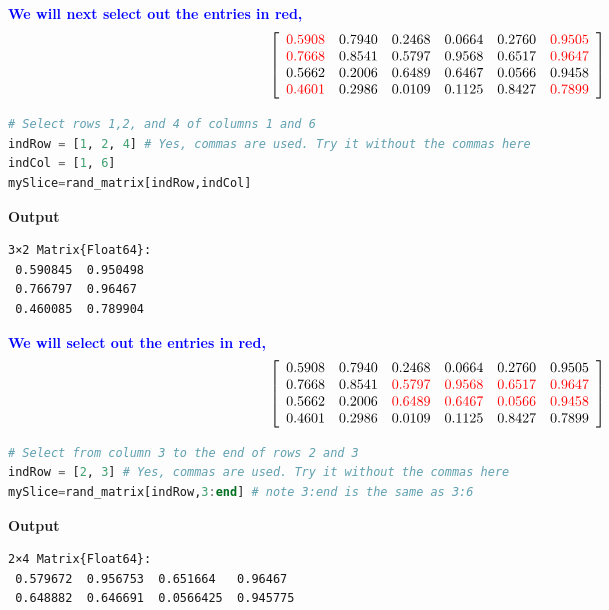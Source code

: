 \textcolor{blue}{\bf We will next select out the entries in red,}
\begin{equation}
\left[
\begin{array}{cccccc}
\color{red} 0.5908 & 0.7940 & 0.2468 & 0.0664 & 0.2760 & \color{red} 0.9505 \\
\color{red} 0.7668 & 0.8541 &  0.5797 &  0.9568 & 0.6517 &\color{red}  0.9647 \\
0.5662 & 0.2006 &  0.6489 &  0.6467 & 0.0566 & 0.9458 \\
\color{red} 0.4601 & 0.2986 & 0.0109 & 0.1125 & 0.8427 & \color{red} 0.7899 \\
\end{array}
\right]
\end{equation}

\begin{lstlisting}[language=Julia,style=mystyle]
# Select rows 1,2, and 4 of columns 1 and 6
indRow = [1, 2, 4] # Yes, commas are used. Try it without the commas here
indCol = [1, 6]
mySlice=rand_matrix[indRow,indCol]
\end{lstlisting}
\textbf{Output} 
\begin{verbatim}
3×2 Matrix{Float64}:
 0.590845  0.950498
 0.766797  0.96467
 0.460085  0.789904
\end{verbatim}

\textcolor{blue}{\bf We will select out the entries in red,}
\begin{equation}
\left[
\begin{array}{cccccc}
0.5908 & 0.7940 & 0.2468 & 0.0664 & 0.2760 & 0.9505 \\
0.7668 & 0.8541 & \color{red} 0.5797 & \color{red} 0.9568 & \color{red}0.6517 & \color{red}0.9647 \\
0.5662 & 0.2006 & \color{red} 0.6489 & \color{red} 0.6467 & \color{red}0.0566 & \color{red}0.9458 \\
0.4601 & 0.2986 & 0.0109 & 0.1125 & 0.8427 & 0.7899 \\
\end{array}
\right]
\end{equation}

\begin{lstlisting}[language=Julia,style=mystyle]
# Select from column 3 to the end of rows 2 and 3
indRow = [2, 3] # Yes, commas are used. Try it without the commas here
mySlice=rand_matrix[indRow,3:end] # note 3:end is the same as 3:6
\end{lstlisting}
\textbf{Output} 
\begin{verbatim}
2×4 Matrix{Float64}:
 0.579672  0.956753  0.651664   0.96467
 0.648882  0.646691  0.0566425  0.945775
\end{verbatim}

